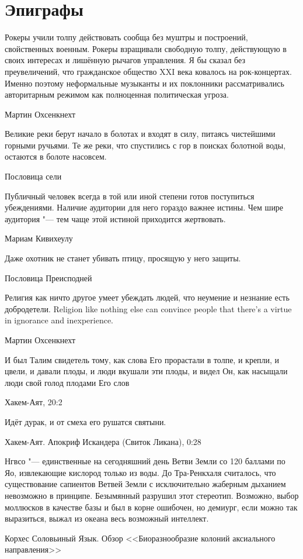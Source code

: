 \chapter{Эпиграфы}

\epigraph
{Рокеры учили толпу действовать сообща без муштры и построений, свойственных военным.
Рокеры взращивали свободную толпу, действующую в своих интересах и лишённую рычагов управления.
Я бы сказал без преувеличений, что гражданское общество XXI века ковалось на рок-концертах.
Именно поэтому неформальные музыканты и их поклонники рассматривались авторитарным режимом как полноценная политическая угроза.}
{Мартин Охсенкнехт}

\epigraph
{Великие реки берут начало в болотах и входят в силу, питаясь чистейшими горными ручьями.
Те же реки, что спустились с гор в поисках болотной воды, остаются в болоте насовсем.}
{Пословица сели}

\epigraph
{Публичный человек всегда в той или иной степени готов поступиться убеждениями.
Наличие аудитории для него гораздо важнее истины.
Чем шире аудитория "--- тем чаще этой истиной приходится жертвовать.}
{Мариам Кивихеулу}

\epigraph
{Даже охотник не станет убивать птицу, просящую у него защиты.}
{Пословица Преисподней}

\epigraph{
{Религия как ничто другое умеет убеждать людей, что неумение и незнание есть добродетели.}
{Religion like nothing else can convince people that there's a virtue in ignorance and inexperience.}
}{
Мартин Охсенкнехт
}

\epigraph
{\ldotst И был Талим свидетель тому, как слова Его прорастали в толпе, и крепли, и цвели, и давали плоды, и люди вкушали эти плоды, и видел Он, как насыщали люди свой голод плодами Его слов\ldotst}
{Хакем-Аят, 20:2}

\epigraph
{Идёт дурак, и от смеха его рушатся святыни.}
{Хакем-Аят. Апокриф Искандера (Свиток Ликана), 0:28}

\epigraph
{Нгвсо "--- единственные на сегодняшний день Ветви Земли со 120 баллами по Яо, извлекающие кислород только из воды.
До Тра-Ренкхаля считалось, что существование сапиентов Ветвей Земли с исключительно жаберным дыханием невозможно в принципе.
Безымянный разрушил этот стереотип.
Возможно, выбор моллюсков в качестве базы и был в корне ошибочен, но демиург, если можно так выразиться, выжал из океана весь возможный интеллект.}
{Корхес Соловьиный Язык.
Обзор <<Биоразнообразие колоний аксиального направления>>}

